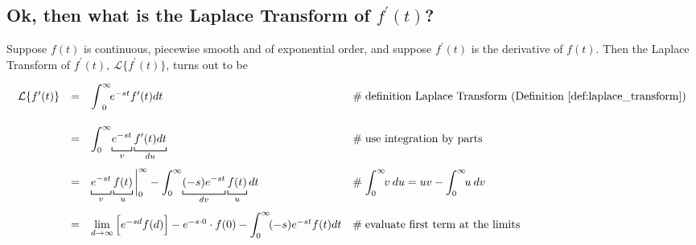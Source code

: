 \documentclass{article}
\theoremstyle{definition}
\begin{document}
\newpage

\subsection{Ok, then what is the Laplace Transform of $f^\prime (t)$?}
\label{sec:f_prime}
Suppose $f(t)$ is continuous, piecewise smooth and of exponential order, and suppose $f^\prime(t)$ is the derivative of $f(t)$. Then the
Laplace Transform of $f^\prime(t), \: \mathcal{L}\{f^\prime(t)\}$, turns out to be

\begin{equation*}
\begin{array}{lllll}
\mathcal{L}\{f^\prime(t)\}
&=& \mathlarger{\int} ^\infty_0 \! e^{-st}  f^\prime(t) dt                                                                                                                    &\mathrel{\#} \text{definition Laplace Transform (Definition \ref{def:laplace_transform})} \\  
[20pt]                                                                                                                                                                                               %
&=& \mathlarger{\int}^\infty_0 \! \underbracket [0.15 ex] {\strut e^{-st}}_{v}  \underbracket [0.15 ex] {\strut f^\prime(t) dt}_{du}    &\mathrel{\#} \text{use integration by parts}                                                                      \\  
[20pt]                                                                                                                                                                                               %
&=& \underbracket [0.15 ex] {\strut e^{-st}}_{v}  \underbracket [0.15 ex] {\strut f(t)}_{u} \bigg |^\infty_0   -   
        \mathlarger{\int}^\infty_0 \! \underbracket [0.15 ex] {\strut (-s) e^{-st}}_{dv}  \underbracket [0.15 ex] {\strut f(t)}_{u} dt 
        &\mathrel{\#} \mathlarger{\int}_0^\infty \! v \: du = uv - \mathlarger{\int}_0^\infty \! u \: dv                                                                                                                                                                                                \\  
[20pt]                                                                                                                                                                                               %
&=& \lim\limits_{d \to \infty}\Big [e^{-sd} f(d) \Big ] - e^{-s \cdot 0} \cdot f(0) - \mathlarger{\int}^\infty_0 \!  (-s) e^{-st}  f(t) dt         &\mathrel{\#} \text{evaluate first term at the limits}                                                           \\

\end{array}
\end{equation*}
\end{document}
